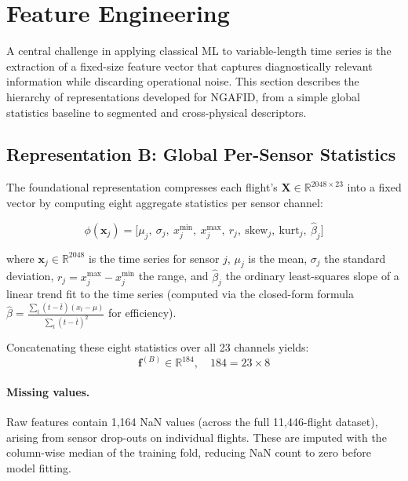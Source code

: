 \section{Feature Engineering}
\label{sec:features}

A central challenge in applying classical ML to variable-length time series is
the extraction of a fixed-size feature vector that captures diagnostically
relevant information while discarding operational noise. This section describes
the hierarchy of representations developed for NGAFID, from a simple global
statistics baseline to segmented and cross-physical descriptors.

\subsection{Representation B: Global Per-Sensor Statistics}
\label{subsec:reprB}

The foundational representation compresses each flight's
$\mathbf{X} \in \mathbb{R}^{2048 \times 23}$ into a fixed vector by computing
eight aggregate statistics per sensor channel:

\begin{equation}
    \phi(\mathbf{x}_j) = \bigl[\mu_j,\ \sigma_j,\ x_j^{\min},\ x_j^{\max},\
        r_j,\ \text{skew}_j,\ \text{kurt}_j,\ \hat{\beta}_j\bigr]
    \label{eq:reprB_stats}
\end{equation}

where $\mathbf{x}_j \in \mathbb{R}^{2048}$ is the time series for sensor $j$,
$\mu_j$ is the mean, $\sigma_j$ the standard deviation, $r_j = x_j^{\max} -
x_j^{\min}$ the range, and $\hat{\beta}_j$ the ordinary least-squares slope of
a linear trend fit to the time series (computed via the closed-form formula
$\hat{\beta} = \frac{\sum_t (t - \bar{t})(x_t - \mu)}{\sum_t (t - \bar{t})^2}$
for efficiency).

Concatenating these eight statistics over all 23 channels yields:
\begin{equation}
    \mathbf{f}^{(B)} \in \mathbb{R}^{184}, \quad
    184 = 23 \times 8
    \label{eq:reprB_dim}
\end{equation}

\paragraph{Missing values.} Raw features contain 1{,}164 NaN values (across the
full 11{,}446-flight dataset), arising from sensor drop-outs on individual
flights. These are imputed with the column-wise median of the training fold,
reducing NaN count to zero before model fitting.

